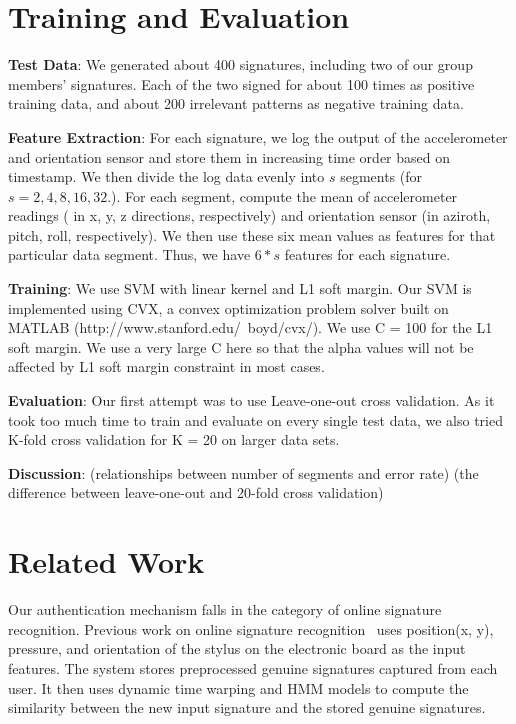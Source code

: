 \documentclass[12pt]{article}
\begin{document}
\section{Training and Evaluation}

\textbf{Test Data}:
We generated about 400 signatures, including two of our group members' signatures. Each of the two signed for about 100 times as positive training data, and about 200 irrelevant patterns as negative training data.

\textbf{Feature Extraction}:
For each signature, we log the output of the accelerometer and orientation sensor and store them in increasing time order based on timestamp. We then divide the log data evenly into $s$ segments (for $s = 2,4,8,16,32$.). For each segment, compute the mean of accelerometer readings ( in x, y, z directions, respectively) and orientation sensor (in aziroth, pitch, roll, respectively). We then use these six mean values as features for that particular data segment. Thus, we have $6*s$ features for each signature.

\textbf{Training}:
We use SVM with linear kernel and L1 soft margin. Our SVM is implemented using CVX, a convex optimization problem solver built on MATLAB (http://www.stanford.edu/~boyd/cvx/). We use C = 100 for the L1 soft margin. We use a very large C here so that the alpha values will not be affected by L1 soft margin constraint in most cases.

\textbf{Evaluation}:
Our first attempt was to use Leave-one-out cross validation. As it took too much time to train and evaluate on every single test data, we also tried K-fold cross validation for K = 20 on larger data sets.

\textbf{Discussion}:
(relationships between number of segments and error rate)
(the difference between leave-one-out and 20-fold cross validation)

\section{Related Work}

Our authentication mechanism falls in the category of online signature recognition. Previous work on online signature recognition~\cite{zanuy:2006} uses position(x, y), pressure, and orientation of the stylus on the electronic board as the input features. The system stores preprocessed genuine signatures captured from each user. It then uses dynamic time warping and HMM models to compute the similarity between the new input signature and the stored genuine signatures.
\end{document}
